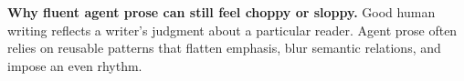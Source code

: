 \noindent
\textbf{Why fluent agent prose can still feel choppy or sloppy.} Good human
writing reflects a writer's judgment about a particular reader. Agent prose
often relies on reusable patterns that flatten emphasis, blur semantic
relations, and impose an even rhythm.
